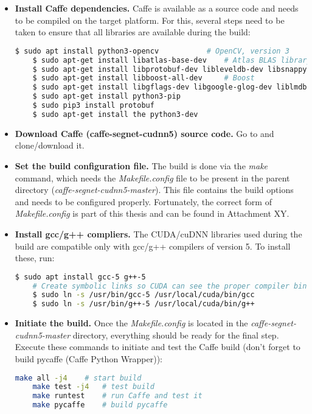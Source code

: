 \begin{itemize}
		
	\item \textbf{Install Caffe dependencies.} Caffe is available as a source code and needs to be compiled on the target platform. For this, several steps need to be taken to ensure that all libraries are available during the build: \cite{caffe}
	
	\begin{lstlisting}[language=bash]
	$ sudo apt install python3-opencv 			# OpenCV, version 3
	$ sudo apt-get install libatlas-base-dev 	# Atlas BLAS library
	$ sudo apt-get install libprotobuf-dev libleveldb-dev libsnappy-dev libopencv-dev libhdf5-serial-dev protobuf-compiler
	$ sudo apt-get install libboost-all-dev		# Boost
	$ sudo apt-get install libgflags-dev libgoogle-glog-dev liblmdb-dev
	$ sudo apt-get install python3-pip
	$ sudo pip3 install protobuf
	$ sudo apt-get install the python3-dev
	\end{lstlisting}
	
	\item \textbf{Download Caffe (caffe-segnet-cudnn5) source code.} Go to \cite{filip_github_caffe} and clone/download it. 
	\item \textbf{Set the build configuration file.} The build is done via the \textit{make} command, which needs the \textit{Makefile.config} file to be present in the parent directory (\textit{caffe-segnet-cudnn5-master}). This file contains the build options and needs to be configured properly. Fortunately, the correct form of \textit{Makefile.config} is part of this thesis and can be found in Attachment XY. 
	
	\item \textbf{Install gcc/g++ compliers.} The CUDA/cuDNN libraries used during the build are compatible only with gcc/g++ compilers of version 5. To install these, run:
	
	\begin{lstlisting}[language=bash]
	$ sudo apt install gcc-5 g++-5
	# Create symbolic links so CUDA can see the proper compiler binaries
	$ sudo ln -s /usr/bin/gcc-5 /usr/local/cuda/bin/gcc
	$ sudo ln -s /usr/bin/g++-5 /usr/local/cuda/bin/g++
	\end{lstlisting}
	
	\item \textbf{Initiate the build.} Once the \textit{Makefile.config} is located in the \textit{caffe-segnet-cudnn5-master} directory, everything should be ready for the final step. Execute these commands to initiate and test the Caffe build (don't forget to build pycaffe (Caffe Python Wrapper)):
	
	\begin{lstlisting}[language=bash]
	make all -j4	# start build
	make test -j4	# test build
	make runtest	# run Caffe and test it
	make pycaffe	# build pycaffe 
	\end{lstlisting} 	
\end{itemize}





